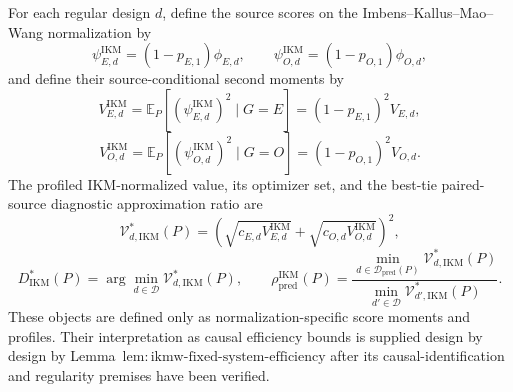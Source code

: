 For each regular design \(d\), define the source scores on the Imbens--Kallus--Mao--Wang normalization by
\[
 \psi_{E,d}^{\mathrm{IKM}}=(1-p_{E,1})\phi_{E,d},
 \qquad
 \psi_{O,d}^{\mathrm{IKM}}=(1-p_{O,1})\phi_{O,d},
\]
and define their source-conditional second moments by
\[
 V_{E,d}^{\mathrm{IKM}}
 =\mathbb E_P[(\psi_{E,d}^{\mathrm{IKM}})^2\mid G=E]
 =(1-p_{E,1})^2V_{E,d},
\]
\[
 V_{O,d}^{\mathrm{IKM}}
 =\mathbb E_P[(\psi_{O,d}^{\mathrm{IKM}})^2\mid G=O]
 =(1-p_{O,1})^2V_{O,d}.
\]
The profiled IKM-normalized value, its optimizer set, and the best-tie paired-source diagnostic approximation ratio are
\[
 \mathcal V_{d,\mathrm{IKM}}^*(P)
 =\left(
 \sqrt{c_{E,d}V_{E,d}^{\mathrm{IKM}}}
 +\sqrt{c_{O,d}V_{O,d}^{\mathrm{IKM}}}
 \right)^2,
\]
\[
 D_{\mathrm{IKM}}^*(P)
 =\arg\min_{d\in\mathcal D}\mathcal V_{d,\mathrm{IKM}}^*(P),
 \qquad
 \rho_{\mathrm{pred}}^{\mathrm{IKM}}(P)
 =\frac{\min_{d\in\mathcal D_{\mathrm{pred}}(P)}
 \mathcal V_{d,\mathrm{IKM}}^*(P)}
 {\min_{d'\in\mathcal D}\mathcal V_{d',\mathrm{IKM}}^*(P)}.
\]
These objects are defined only as normalization-specific score moments and profiles. Their interpretation as causal efficiency bounds is supplied design by design by Lemma~\(\mathrm{lem{:}ikmw\text{-}fixed\text{-}system\text{-}efficiency}\) after its causal-identification and regularity premises have been verified.